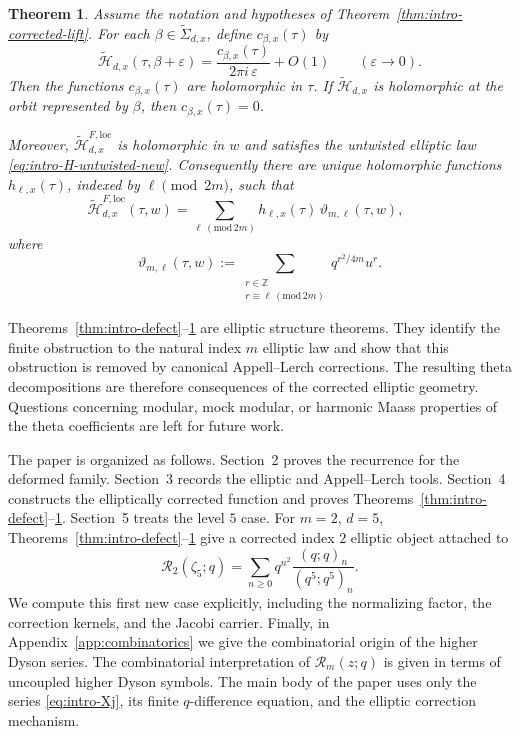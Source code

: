 \documentclass[12pt]{amsart}
\numberwithin{equation}{section}
\newtheorem{theorem}{Theorem}[section]
\newcommand{\ZZ}{\mathbb Z}
\newcommand{\RRm}{\mathcal R}
\begin{document}
\begin{theorem}%
\label{thm:intro-finite-part}
Assume the notation and hypotheses of Theorem~\ref{thm:intro-corrected-lift}.
For each \(\beta\in\widetilde\Sigma_{d,x}\), define \(c_{\beta,x}(\tau)\) by
\[
\widetilde{\mathcal H}_{d,x}(\tau,\beta+\varepsilon)
=
\frac{c_{\beta,x}(\tau)}{2\pi i\,\varepsilon}+O(1)
\qquad(\varepsilon\to0).
\]
Then the functions \(c_{\beta,x}(\tau)\) are holomorphic in \(\tau\).  If
\(\widetilde{\mathcal H}_{d,x}\) is holomorphic at the orbit represented by
\(\beta\), then \(c_{\beta,x}(\tau)=0\).

Moreover, \(\widetilde{\mathcal H}^{F,\mathrm{loc}}_{d,x}\) is holomorphic in
\(w\) and satisfies the untwisted elliptic law \eqref{eq:intro-H-untwisted-new}.
Consequently there are unique holomorphic functions \(h_{\ell,x}(\tau)\),
indexed by \(\ell\pmod{2m}\), such that
\begin{equation}\label{eq:intro-theta-decomp-new}
\widetilde{\mathcal H}^{F,\mathrm{loc}}_{d,x}(\tau,w)
=
\sum_{\ell\,(\mathrm{mod}\,2m)}
h_{\ell,x}(\tau)\,\vartheta_{m,\ell}(\tau,w),
\qquad
\end{equation}
where
$$
\vartheta_{m,\ell}(\tau,w):=
\sum_{\substack{r\in\ZZ\\ r\equiv\ell\,(\mathrm{mod}\,2m)}}
q^{r^2/4m}u^r.
$$
\end{theorem}

Theorems~\ref{thm:intro-defect}--\ref{thm:intro-finite-part} are elliptic structure theorems. They identify the finite
obstruction to the natural index \(m\) elliptic law and show that this
obstruction is removed by canonical Appell--Lerch corrections. The resulting
theta decompositions are therefore consequences of the corrected elliptic
geometry. Questions concerning modular, mock modular, or harmonic Maass
properties of the theta coefficients are left for future work.


The paper is organized as follows.  Section~2 proves the recurrence for the
deformed family.  Section~3 records the elliptic and Appell--Lerch tools.
Section~4 constructs the elliptically corrected function and proves
Theorems~\ref{thm:intro-defect}--\ref{thm:intro-finite-part}.
Section~5 treats the level \(5\) case.  
For \(m=2\), \(d=5\), Theorems~\ref{thm:intro-defect}--\ref{thm:intro-finite-part}
give a corrected index \(2\) elliptic object attached to
\[
\RRm_2(\zeta_5;q)=
\sum_{n\geq0}q^{n^2}\frac{(q;q)_n}{(q^5;q^5)_n}.
\]
We compute this first new case explicitly, including
the normalizing factor, the correction kernels, and the Jacobi carrier.
Finally,  in Appendix~\ref{app:combinatorics} we
give the combinatorial origin of the higher Dyson series.
The combinatorial interpretation of \(\RRm_m(z;q)\) is given in terms of uncoupled
higher Dyson symbols. The main
body of the paper uses only the series \eqref{eq:intro-Xj}, its finite
\(q\)-difference equation, and the elliptic correction mechanism.
\end{document}
